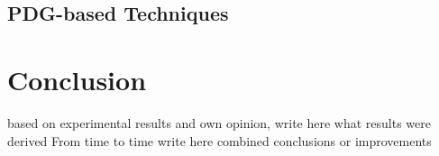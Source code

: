 \documentclass{report}
\begin{document}
\section{PDG-based Techniques}
\label{sec: pdg_tech}


\chapter{Conclusion}
\label{cha:Conclusion}

based on experimental results and own opinion, write here what results were derived 
From time to time write here combined conclusions or improvements



\end{document}
